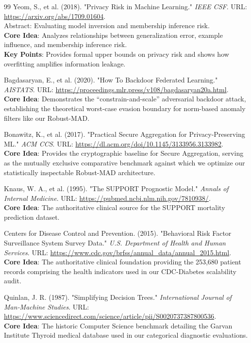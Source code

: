 \documentclass[10pt, a4paper, twocolumn]{article}
\begin{document}
\begin{thebibliography}{99}
 Yeom, S., et al. (2018). "Privacy Risk in Machine Learning." \textit{IEEE CSF}. URL: \url{https://arxiv.org/abs/1709.01604}. \\ Abstract: Evaluating model inversion and membership inference risk. \\
\textbf{Core Idea}: Analyzes relationships between generalization error, example influence, and membership inference risk. \\
\textbf{Key Points}: Provides formal upper bounds on privacy risk and shows how overfitting amplifies information leakage.

 Bagdasaryan, E., et al. (2020). "How To Backdoor Federated Learning." \textit{AISTATS}. URL: \url{https://proceedings.mlr.press/v108/bagdasaryan20a.html}. \\
\textbf{Core Idea}: Demonstrates the ``constrain-and-scale'' adversarial backdoor attack, establishing the theoretical worst-case evasion boundary for norm-based anomaly filters like our Robust-MAD.

 Bonawitz, K., et al. (2017). "Practical Secure Aggregation for Privacy‑Preserving ML." \textit{ACM CCS}. URL: \url{https://dl.acm.org/doi/10.1145/3133956.3133982}. \\
\textbf{Core Idea}: Provides the cryptographic baseline for Secure Aggregation, serving as the mutually exclusive comparative benchmark against which we optimize our statistically inspectable Robust-MAD architecture.

 Knaus, W. A., et al. (1995). "The SUPPORT Prognostic Model." \textit{Annals of Internal Medicine}. URL: \url{https://pubmed.ncbi.nlm.nih.gov/7810938/}. \\
\textbf{Core Idea}: The authoritative clinical source for the SUPPORT mortality prediction dataset.

 Centers for Disease Control and Prevention. (2015). "Behavioral Risk Factor Surveillance System Survey Data." \textit{U.S. Department of Health and Human Services}. URL: \url{https://www.cdc.gov/brfss/annual_data/annual_2015.html}. \\
\textbf{Core Idea}: The authoritative clinical foundation providing the 253,680 patient records comprising the health indicators used in our CDC-Diabetes scalability audit.

 Quinlan, J. R. (1987). "Simplifying Decision Trees." \textit{International Journal of Man‑Machine Studies}. URL: \url{https://www.sciencedirect.com/science/article/pii/S0020737387800536}. \\
\textbf{Core Idea}: The historic Computer Science benchmark detailing the Garvan Institute Thyroid medical database used in our categorical diagnostic evaluations.


\end{thebibliography}
\end{document}
